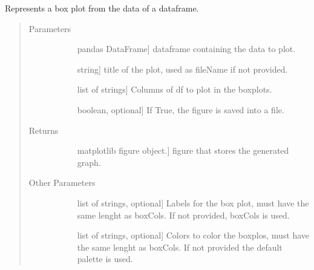 \documentclass[letterpaper,10pt,english]{sphinxmanual}
\begin{document}
\begin{fulllineitems}
\label{\detokenize{rstFiles/boxPlot:boxPlot.boxPlotter}}
Represents a box plot from the data of a dataframe.
\begin{quote}\begin{description}
\item[{Parameters}] \leavevmode\begin{description}
\item[{}] \leavevmode{[}pandas DataFrame{]}
dataframe containing the data to plot.

\item[{}] \leavevmode{[}string{]}
title of the plot, used as fileName if not provided.

\item[{}] \leavevmode{[}list of strings{]}
Columns of df to plot in the boxplots.

\item[{}] \leavevmode{[}boolean, optional{]}
If True, the figure is saved into a file.

\end{description}

\item[{Returns}] \leavevmode\begin{description}
\item[{}] \leavevmode{[}matplotlib figure object.{]}
figure that stores the generated graph.

\end{description}

\item[{Other Parameters}] \leavevmode\begin{description}
\item[{}] \leavevmode{[}list of strings, optional{]}
Labels for the box plot, must have the same lenght as boxCols. 
If not provided, boxCols is used.

\item[{}] \leavevmode{[}list of strings, optional{]}
Colors to color the boxplos, must have the same lenght as boxCols. 
If not provided the default palette is used.


\end{description}
\end{description}
\end{quote}
\end{fulllineitems}
\end{document}
